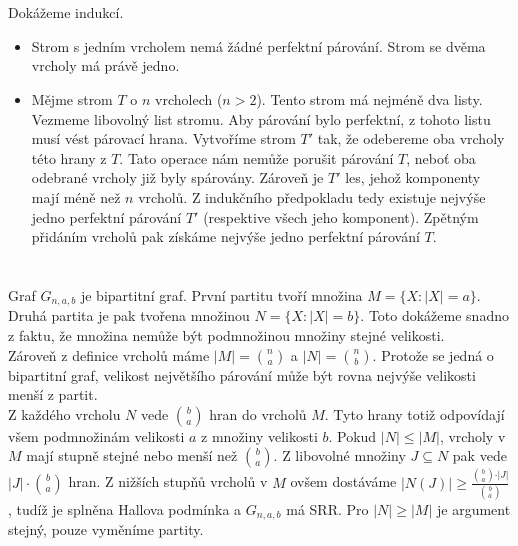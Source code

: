 \documentclass{scrartcl}
\begin{document}
    \section{}
        Dokážeme indukcí. \\
        \begin{itemize}
            \item Strom s jedním vrcholem nemá žádné perfektní párování. Strom se dvěma vrcholy má právě jedno.
            \item Mějme strom $T$ o $n$ vrcholech ($n > 2$). Tento strom má nejméně dva listy. Vezmeme libovolný list stromu. Aby párování bylo perfektní, z tohoto listu musí vést párovací hrana. Vytvoříme strom $T'$ tak, že odebereme oba vrcholy této hrany z $T$. Tato operace nám nemůže porušit párování $T$, neboť oba odebrané vrcholy již byly spárovány. Zároveň je $T'$ les, jehož komponenty mají méně než $n$ vrcholů. Z indukčního předpokladu tedy existuje nejvýše jedno perfektní párování $T'$ (respektive všech jeho komponent). Zpětným přidáním vrcholů pak získáme nejvýše jedno perfektní párování $T$.
        \end{itemize}

    \section{}
        Graf $G_{n,a,b}$ je bipartitní graf. První partitu tvoří množina $M = \{ X :\vert X \vert = a\}$. Druhá partita je pak tvořena množinou $N = \{ X : \vert X \vert = b \}$. Toto dokážeme snadno z faktu, že množina nemůže být podmnožinou množiny stejné velikosti.\\

        Zároveň z definice vrcholů máme $\vert M \vert = \binom{n}{a}$ a $\vert N \vert = \binom{n}{b}$. Protože se jedná o bipartitní graf, velikost největšího párování může být rovna nejvýše velikosti menší z partit.\\

        Z každého vrcholu $N$ vede $\binom{b}{a}$ hran do vrcholů $M$. Tyto hrany totiž odpovídají všem podmnožinám velikosti $a$ z množiny velikosti $b$. Pokud $\vert N \vert \leq \vert M \vert$, vrcholy v $M$ mají stupně stejné nebo menší než $\binom{b}{a}$. Z libovolné množiny $J \subseteq N$ pak vede $\vert J \vert \cdot \binom{b}{a}$ hran. Z nižších stupňů vrcholů v $M$ ovšem dostáváme $\vert N(J) \vert \geq \frac{\binom{b}{a} \cdot \vert J \vert}{\binom{b}{a}}$, tudíž je splněna Hallova podmínka a $G_{n,a,b}$ má SRR. Pro $\vert N \vert \geq \vert M \vert$ je argument stejný, pouze vyměníme partity.\\
\end{document}
